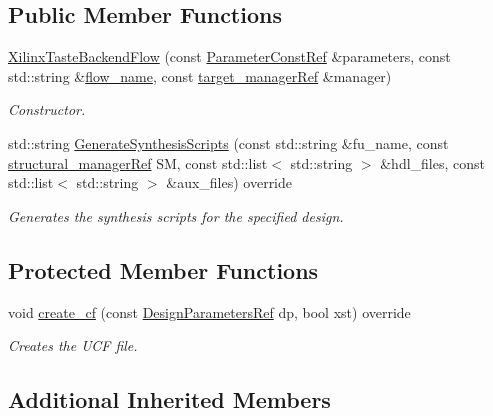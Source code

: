 \subsection*{Public Member Functions}
\begin{DoxyCompactItemize}
\item 
\hyperlink{classXilinxTasteBackendFlow_ad51b29d16855bd8aa2f78ba13db63c67}{Xilinx\+Taste\+Backend\+Flow} (const \hyperlink{Parameter_8hpp_a37841774a6fcb479b597fdf8955eb4ea}{Parameter\+Const\+Ref} \&parameters, const std\+::string \&\hyperlink{classBackendFlow_acb230ccab7e32cf0a88811097ff8c3f8}{flow\+\_\+name}, const \hyperlink{target__manager_8hpp_aee0b586a84fb6eb4faefa6e41e1735a9}{target\+\_\+manager\+Ref} \&manager)
\begin{DoxyCompactList}\small\item\em Constructor. \end{DoxyCompactList}\item 
std\+::string \hyperlink{classXilinxTasteBackendFlow_a8f8760e798f045aaad6cc3b56a00e627}{Generate\+Synthesis\+Scripts} (const std\+::string \&fu\+\_\+name, const \hyperlink{structural__manager_8hpp_ab3136f0e785d8535f8d252a7b53db5b5}{structural\+\_\+manager\+Ref} SM, const std\+::list$<$ std\+::string $>$ \&hdl\+\_\+files, const std\+::list$<$ std\+::string $>$ \&aux\+\_\+files) override
\begin{DoxyCompactList}\small\item\em Generates the synthesis scripts for the specified design. \end{DoxyCompactList}\end{DoxyCompactItemize}
\subsection*{Protected Member Functions}
\begin{DoxyCompactItemize}
\item 
void \hyperlink{classXilinxTasteBackendFlow_a0672740f515c4ef8cefe95feeca8dc12}{create\+\_\+cf} (const \hyperlink{DesignParameters_8hpp_ae36bb1c4c9150d0eeecfe1f96f42d157}{Design\+Parameters\+Ref} dp, bool xst) override
\begin{DoxyCompactList}\small\item\em Creates the U\+CF file. \end{DoxyCompactList}\end{DoxyCompactItemize}
\subsection*{Additional Inherited Members}



